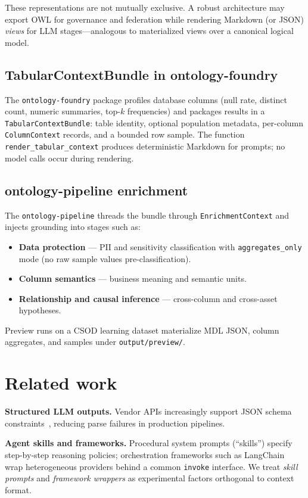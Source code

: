 \documentclass[11pt,a4paper]{article}
\begin{document}
These representations are not mutually exclusive.
A robust architecture may export OWL for governance and federation while rendering Markdown (or JSON) \emph{views} for LLM stages---analogous to materialized views over a canonical logical model.

\subsection{TabularContextBundle in ontology-foundry}
The \texttt{ontology-foundry} package profiles database columns (null rate, distinct count, numeric summaries, top-$k$ frequencies) and packages results in a \texttt{TabularContextBundle}:
table identity, optional population metadata, per-column \texttt{ColumnContext} records, and a bounded row sample.
The function \texttt{render\_tabular\_context} produces deterministic Markdown for prompts; no model calls occur during rendering.

\subsection{ontology-pipeline enrichment}
The \texttt{ontology-pipeline} threads the bundle through \texttt{EnrichmentContext} and injects grounding into stages such as:
\begin{itemize}[leftmargin=*]
  \item \textbf{Data protection} --- PII and sensitivity classification with \texttt{aggregates\_only} mode (no raw sample values pre-classification).
  \item \textbf{Column semantics} --- business meaning and semantic units.
  \item \textbf{Relationship and causal inference} --- cross-column and cross-asset hypotheses.
\end{itemize}
Preview runs on a CSOD learning dataset materialize MDL JSON, column aggregates, and samples under \texttt{output/preview/}.

\section{Related work}
\label{sec:related}

\textbf{Structured LLM outputs.} Vendor APIs increasingly support JSON schema constraints~\cite{openai2024structured,anthropic2025claude,google2025gemini}, reducing parse failures in production pipelines.

\textbf{Agent skills and frameworks.} Procedural system prompts (``skills'') specify step-by-step reasoning policies; orchestration frameworks such as LangChain~\cite{langchain2024} wrap heterogeneous providers behind a common \texttt{invoke} interface.
We treat \emph{skill prompts} and \emph{framework wrappers} as experimental factors orthogonal to context format.
\end{document}
